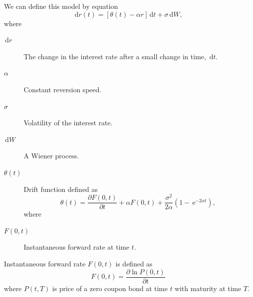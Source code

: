 \documentclass{amsart}
\theoremstyle{definition}\newtheorem{definition}[theorem]{Definition}
\theoremstyle{remark}\newtheorem{remark}[theorem]{Remark}
\newcommand{\e}{\,\mathrm{e}}
\newcommand{\dt}{\,\mathrm{d}t}
\newcommand{\dW}{\,\mathrm{d}W}
\newcommand{\dr}{\,\mathrm{d}r}
\begin{document}
We can define this model by equation
\begin{equation}
\dr(t)=[\theta(t)-\alpha r]\dt+\sigma\dW,
\label{H-Wmodel}
\end{equation}
where
\begin{description}
\item [$\dr$] The change in the interest rate after a small change in time, $\dt$.
\item [$\alpha$   ] Constant reversion speed.%
\item [$\sigma$   ] Volatility of the interest rate.
\item [$\dW$] A Wiener process.
\item [$\theta(t)$] Drift function defined as
\begin{equation}
\theta(t)=\frac{\partial  F(0,t)}{\partial t}+\alpha F(0,t)+\frac{\sigma^2}{2 \alpha}(1-\e^{-2\alpha t}), %
\end{equation}
where
\item[$F(0,t)$] Instantaneous forward rate at time $t$.
\end{description}
Instantaneous forward rate $F(0,t)$ is defined as
\begin{equation}
F(0,t)= \frac{\partial\ln  P(0,t)}{\partial t}
\end{equation}
where $ P(t,T)$ is price of a zero coupon bond at time $t$ with maturity at time $T$.
\end{document}
